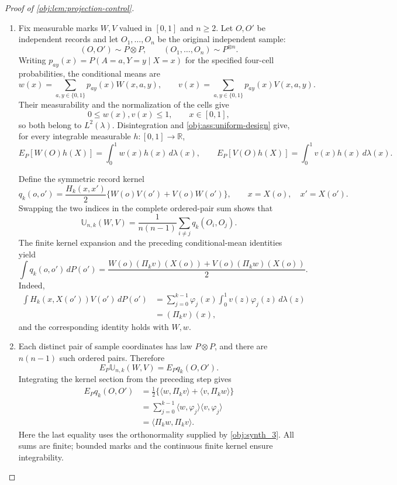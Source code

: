 \documentclass[11pt]{article}
\begin{document}
\begin{proof}[Proof of \cref{obj:lem:projection-control}]
\begin{enumerate}
\item Fix measurable marks \(W,V\) valued in \([0,1]\) and \(n\ge2\). Let \(O,O'\) be independent records and let \(O_1,\ldots,O_n\) be the original independent sample:
\[
(O,O')\sim P\otimes P,
\qquad
(O_1,\ldots,O_n)\sim P^{\otimes n}.
\]
Writing \(p_{ay}(x)=P(A=a,Y=y\mid X=x)\) for the specified four-cell probabilities, the conditional means are
\[
w(x)=\sum_{a,y\in\{0,1\}}p_{ay}(x)W(x,a,y),
\qquad
v(x)=\sum_{a,y\in\{0,1\}}p_{ay}(x)V(x,a,y).
\]
Their measurability and the normalization of the cells give
\[
0\le w(x),v(x)\le1,\qquad x\in[0,1],
\]
so both belong to \(L^2(\lambda)\). Disintegration and
\cref{obj:ass:uniform-design} give, for every integrable measurable \(h:[0,1]\to\mathbb R\),
\[
E_P[W(O)h(X)]=\int_0^1w(x)h(x)\,d\lambda(x),
\qquad
E_P[V(O)h(X)]=\int_0^1v(x)h(x)\,d\lambda(x).
\]

Define the symmetric record kernel
\[
q_k(o,o')
=\frac{H_k(x,x')}{2}
 \{W(o)V(o')+V(o)W(o')\},
\qquad x=X(o),\quad x'=X(o').
\]
Swapping the two indices in the complete ordered-pair sum shows that
\[
\mathbb U_{n,k}(W,V)
=\frac1{n(n-1)}\sum_{i\ne j}q_k(O_i,O_j).
\]
The finite kernel expansion and the preceding conditional-mean identities yield
\[
\int q_k(o,o')\,dP(o')
=\frac{W(o)(\Pi_kv)(X(o))+V(o)(\Pi_kw)(X(o))}{2}.
\]
Indeed,
\[
\begin{aligned}
\int H_k(x,X(o'))V(o')\,dP(o')
&=\sum_{j=0}^{k-1}\varphi_j(x)
  \int_0^1v(z)\varphi_j(z)\,d\lambda(z)\\
&=(\Pi_kv)(x),
\end{aligned}
\]
and the corresponding identity holds with \(W,w\).

\item Each distinct pair of sample coordinates has law \(P\otimes P\), and there are \(n(n-1)\) such ordered pairs. Therefore
\[
E_P\mathbb U_{n,k}(W,V)=E_Pq_k(O,O').
\]
Integrating the kernel section from the preceding step gives
\[
\begin{aligned}
E_Pq_k(O,O')
&=\frac12\{\langle w,\Pi_kv\rangle+\langle v,\Pi_kw\rangle\}\\
&=\sum_{j=0}^{k-1}
 \langle w,\varphi_j\rangle\langle v,\varphi_j\rangle\\
&=\langle\Pi_kw,\Pi_kv\rangle.
\end{aligned}
\]
Here the last equality uses the orthonormality supplied by
\cref{obj:synth_3}. All sums are finite; bounded marks and the continuous finite kernel ensure integrability.


\end{enumerate}
\end{proof}
\end{document}
